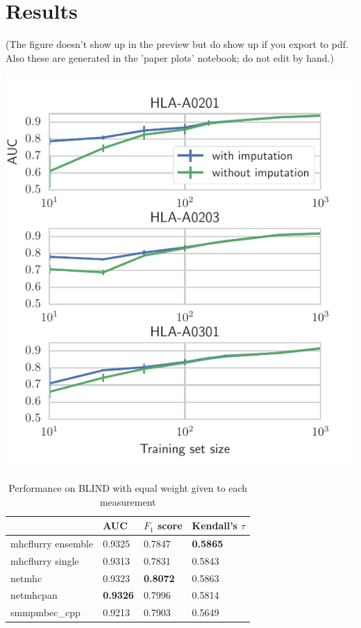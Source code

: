 \section{Results}
(The figure doesn't show up in the preview but do show up if you export to pdf. Also these are generated in the 'paper plots' notebook; do not edit by hand.)

\includegraphics{figures/impute_comparison.pdf}


\begin{table}[h]
\begin{tabular}{llll}
\toprule
{} &              AUC &      $F_1$ score & Kendall's $\tau$ \\
\midrule
mhcflurry ensemble &           0.9325 &           0.7847 &  \textbf{0.5865} \\
mhcflurry single   &           0.9313 &           0.7831 &           0.5843 \\
netmhc             &           0.9323 &  \textbf{0.8072} &           0.5863 \\
netmhcpan          &  \textbf{0.9326} &           0.7996 &           0.5814 \\
smmpmbec_cpp       &           0.9213 &           0.7903 &           0.5649 \\
\bottomrule
\end{tabular}

\caption{Performance on BLIND with equal weight given to each measurement}
\label{tab:measurementweighted}
\end{table}

